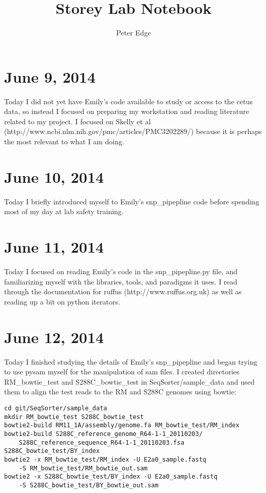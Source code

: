 \documentclass[11pt]{article}
\title{\textbf{Storey Lab Notebook}}
\author{Peter Edge}
\begin{document}
\maketitle

\section*{June 9, 2014}
Today I did not yet have Emily's code available to study or access to the cetus data, so instead I focused on preparing my workstation and reading literature related to my project. I focused on Skelly et al (http://www.ncbi.nlm.nih.gov/pmc/articles/PMC3202289/) because it is perhaps the most relevant to what I am doing.

\section*{June 10, 2014}
Today I briefly introduced myself to Emily's snp\_pipepline code before spending most of my day at lab safety training.

\section*{June 11, 2014}
Today I focused on reading Emily's code in the snp\_pipepline.py file, and familiarizing myself with the libraries, tools, and paradigms it uses. I read through the documentation for ruffus (http://www.ruffus.org.uk) as well as reading up a bit on python iterators.
\section*{June 12, 2014}
Today I finished studying the details of Emily's snp\_pipepline and began trying to use pysam myself for the manipulation of sam files. I created directories RM\_bowtie\_test and S288C\_bowtie\_test in SeqSorter/sample\_data and used them to align the test reads to the RM and S288C genomes using bowtie:
\begin{verbatim}
cd git/SeqSorter/sample_data
mkdir RM_bowtie_test S288C_bowtie_test
bowtie2-build RM11_1A/assembly/genome.fa RM_bowtie_test/RM_index
bowtie2-build S288C_reference_genome_R64-1-1_20110203/
    S288C_reference_sequence_R64-1-1_20110203.fsa S288C_bowtie_test/BY_index
bowtie2 -x RM_bowtie_test/RM_index -U E2a0_sample.fastq
    -S RM_bowtie_test/RM_bowtie_out.sam
bowtie2 -x S288C_bowtie_test/BY_index -U E2a0_sample.fastq
    -S S288C_bowtie_test/BY_bowtie_out.sam
\end{verbatim}
\end{document}

